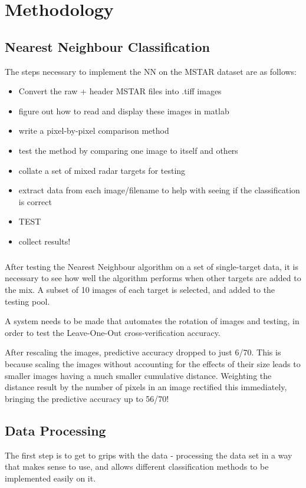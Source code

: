 \chapter{Methodology}
\section{Nearest Neighbour Classification}
The steps necessary to implement the NN on the MSTAR dataset are as follows:\\

\begin{itemize}
\item Convert the raw + header MSTAR files into .tiff images
\item figure out how to read and display these images in matlab
\item write a pixel-by-pixel comparison method
\item test the method by comparing one image to itself and others
\item collate a set of mixed radar targets for testing
\item extract data from each image/filename to help with seeing if the classification is correct
\item TEST
\item collect results!
\end{itemize}

\paragraph{}
After testing the Nearest Neighbour algorithm on a set of single-target data, it is necessary to see how well the algorithm performs when other targets are added to the mix. A subset of 10 images of each target is selected, and added to the testing pool.

A system needs to be made that automates the rotation of images and testing, in order to test the Leave-One-Out cross-verification accuracy.

After rescaling the images, predictive accuracy dropped to just 6/70. This is because scaling the images without accounting for the effects of their size leads to smaller images having a much smaller cumulative distance. Weighting the distance result by the number of pixels in an image rectified this immediately, bringing the predictive accuracy up to 56/70!



\section{Data Processing}
The first step is to get to grips with the data - processing the data set in a way that makes sense to use, and allows different classification methods to be implemented easily on it.

